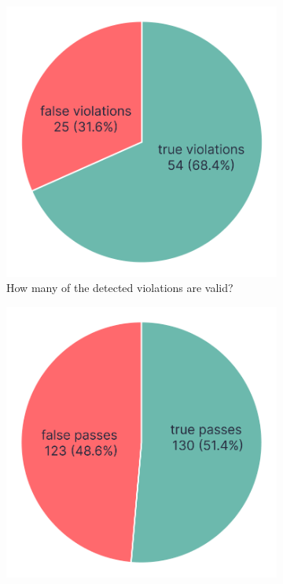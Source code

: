\documentclass{master_thesis}
\begin{document}
\begin{figure}[ht]
	\centering
	\begin{subfigure}{0.4\textwidth}
	\includegraphics[width=\textwidth]{img/failed-tests.png}
	\caption{How many of the detected violations are valid?}
	\label{fig:checks-validity-failed}
	\end{subfigure}
	\hspace{0.05\textwidth}
	\begin{subfigure}{0.4\textwidth}
	\includegraphics[width=\textwidth]{img/passed-tests.png}

\end{subfigure}
\end{figure}
\end{document}
